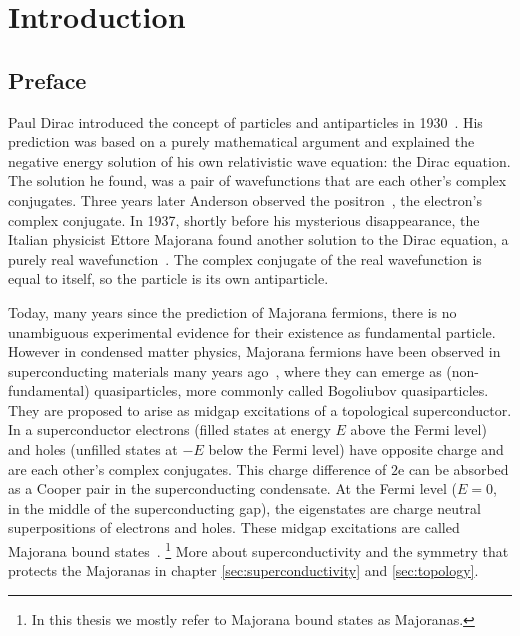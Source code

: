 \chapter{Introduction}
\label{ch:introduction}

\section{Preface}
Paul Dirac introduced the concept of particles and antiparticles in 1930~\cite{Dirac1930}.
His prediction was based on a purely mathematical argument and explained the negative energy solution of his own relativistic wave equation: the Dirac equation.
The solution he found, was a pair of wavefunctions that are each other's complex conjugates.
Three years later Anderson observed the positron~\cite{Anderson1933}, the electron's complex conjugate.
In 1937, shortly before his mysterious disappearance, the Italian physicist Ettore Majorana found another solution to the Dirac equation, a purely real wavefunction~\cite{Majorana1937}.
The complex conjugate of the real wavefunction is equal to itself, so the particle is its own antiparticle.

Today, many years since the prediction of Majorana fermions, there is no unambiguous experimental evidence for their existence as fundamental particle.
However in condensed matter physics, Majorana fermions have been observed in superconducting materials many years ago~\cite{Kopnin1991}, where they can emerge as (non-fundamental) quasiparticles, more commonly called Bogoliubov quasiparticles.
They are proposed to arise as midgap excitations of a topological superconductor.
In a superconductor electrons (filled states at energy $E$ above the Fermi level) and holes (unfilled states at $-E$ below the Fermi level) have opposite charge and are each other's complex conjugates.
This charge difference of $2\textrm{e}$ can be absorbed as a Cooper pair in the superconducting condensate.
At the Fermi level ($E=0$, in the middle of the superconducting gap), the eigenstates are charge neutral superpositions of electrons and holes.
These midgap excitations are called Majorana bound states~\cite{Beenakker2013}.
\footnote{In this thesis we mostly refer to Majorana bound states as Majoranas.}
More about superconductivity and the symmetry that protects the Majoranas in chapter \ref{sec:superconductivity} and \ref{sec:topology}.

